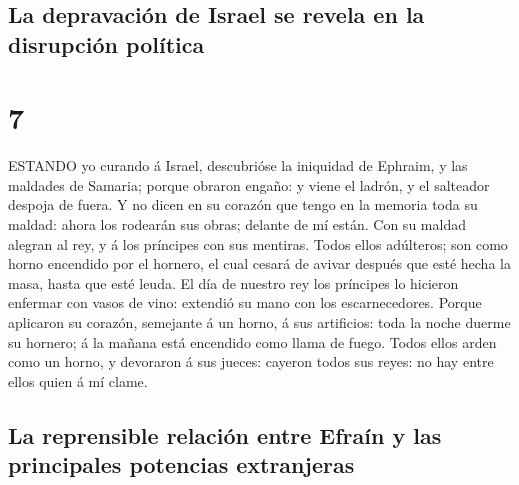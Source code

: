 \hypertarget{la-depravaciuxf3n-de-israel-se-revela-en-la-disrupciuxf3n-poluxedtica}{%
\subsection{La depravación de Israel se revela en la disrupción
política}\label{la-depravaciuxf3n-de-israel-se-revela-en-la-disrupciuxf3n-poluxedtica}}

\hypertarget{section-6}{%
\section{7}\label{section-6}}

 ESTANDO yo curando á Israel, descubrióse la iniquidad de
Ephraim, y las maldades de Samaria; porque obraron engaño: y viene el
ladrón, y el salteador despoja de fuera.  Y no dicen en su
corazón que tengo en la memoria toda su maldad: ahora los rodearán sus
obras; delante de mí están.  Con su maldad alegran al rey, y
á los príncipes con sus mentiras.  Todos ellos adúlteros;
son como horno encendido por el hornero, el cual cesará de avivar
después que esté hecha la masa, hasta que esté leuda.  El
día de nuestro rey los príncipes lo hicieron enfermar con vasos de vino:
extendió su mano con los escarnecedores.  Porque aplicaron
su corazón, semejante á un horno, á sus artificios: toda la noche duerme
su hornero; á la mañana está encendido como llama de fuego. 
Todos ellos arden como un horno, y devoraron á sus jueces: cayeron todos
sus reyes: no hay entre ellos quien á mí clame.

\hypertarget{la-reprensible-relaciuxf3n-entre-efrauxedn-y-las-principales-potencias-extranjeras}{%
\subsection{La reprensible relación entre Efraín y las principales
potencias
extranjeras}\label{la-reprensible-relaciuxf3n-entre-efrauxedn-y-las-principales-potencias-extranjeras}}

